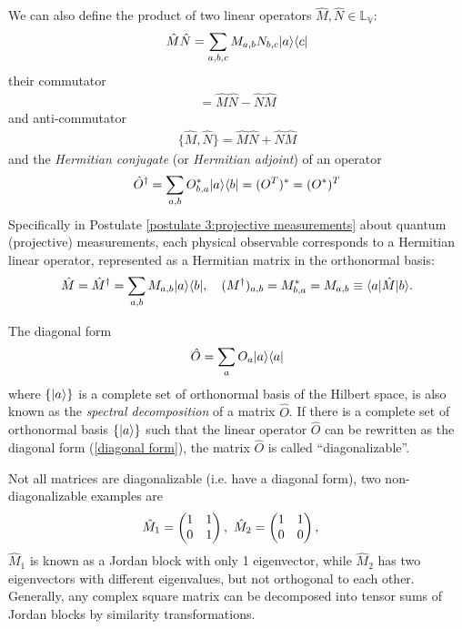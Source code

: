 We can also define the product of two linear operators $\hat M,\hat N\in\mathbb{L}_\mathbb{V}$:
\begin{align}
\hat M\hat N=\sum_{a,b,c}M_{a,b}N_{b,c}|{a}\rangle\langle{c}|
\end{align}
their commutator
\begin{align}
[\hat M,\hat N]=\hat M\hat N-\hat N\hat M
\end{align}
and anti-commutator
\begin{align}
\{\hat M,\hat N\}=\hat M\hat N+\hat N\hat M
\end{align}
and the \emph{Hermitian conjugate} (or \emph{Hermitian adjoint}) of an operator
\begin{align}
\hat O^\dagger=\sum_{a,b}O^\ast_{b,a}|{a}\rangle\langle{b}|=(O^T)^\ast=(O^\ast)^T
\end{align}
Specifically in Postulate \ref{postulate 3:projective measurements} about quantum (projective) measurements, each physical observable corresponds to a Hermitian linear operator, represented as a Hermitian matrix in the orthonormal basis:
\begin{align}
\hat M=\hat M^\dagger=\sum_{a,b}M_{a,b}|{a}\rangle\langle{b}|,~~~(M^\dagger)_{a,b}=M^\ast_{b,a}=M_{a,b}\equiv\langle{a|\hat M|b}\rangle.
\end{align}

The diagonal form
\begin{align}\label{diagonal form}
\hat O=\sum_a O_a|{a}\rangle\langle{a}|
\end{align}
where $\{|{a}\rangle\}$ is a complete set of orthonormal basis of the Hilbert space, is also known as the \emph{spectral decomposition} of a matrix $\hat O$. If there is a complete set of orthonormal basis $\{|{a}\rangle\}$ such that the linear operator $\hat O$ can be rewritten as the diagonal form (\ref{diagonal form}), the matrix $\hat O$ is called ``diagonalizable''.

Not all matrices are diagonalizable (i.e. have a diagonal form), two non-diagonalizable examples are
\begin{align}
\hat M_1=\begin{pmatrix}1&1\\0&1\end{pmatrix},~\hat M_2=\begin{pmatrix}1&1\\0&0\end{pmatrix},~~~
\end{align}
$\hat M_1$ is known as a Jordan block with only 1 eigenvector, while $\hat M_2$ has two eigenvectors with different eigenvalues, but not orthogonal to each other. Generally, any complex square matrix can be decomposed into tensor sums of Jordan blocks by similarity transformations.\\

